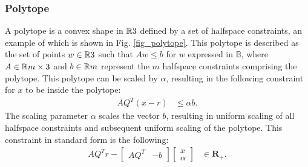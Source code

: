 \subsubsection{Polytope}
A polytope is a convex shape in $\mathbb{R}{3}$ defined by a set of halfspace constraints, an example of which is shown in Fig. \ref{fig_polytope}. This polytope is described as the set of points $w \in \mathbb{R}{3}$ such that  $Aw\leq b$ for $w$ expressed in $\mathbb{B}$, where $A \in \mathbb{R}{m \times 3}$ and $b \in \mathbb{R}{m}$ represent the $m$ halfspace constraints comprising the polytope. This polytope can be scaled by $\alpha$, resulting in the following constraint for $x$ to be inside the polytope:
\begin{align}
    AQ^T (x - r) &\leq \alpha b.
\end{align}
The scaling parameter $\alpha$ scales the vector $b$, resulting in uniform scaling of all halfspace constraints and subsequent uniform scaling of the polytope. This constraint in standard form is the following: 
\begin{align}
   AQ^Tr  - \begin{bmatrix} A Q^T & -b \end{bmatrix} \begin{bmatrix} x \\ \alpha \end{bmatrix} &\in \mathbf{R}_+ .
\end{align}
